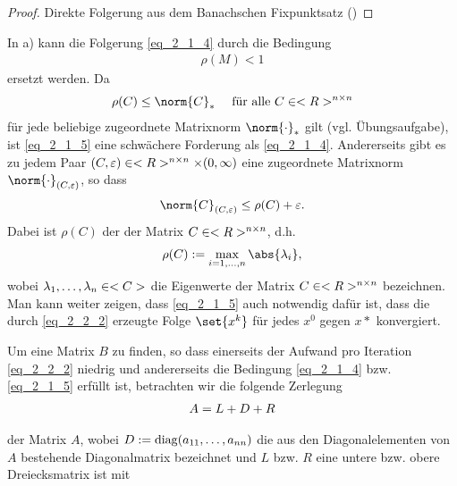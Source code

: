 \begin{proof}
	Direkte Folgerung aus dem Banachschen Fixpunktsatz ()
\end{proof}


\begin{remark}
	In a) kann die Folgerung \cref{eq_2_1_4} durch die Bedingung
	\begin{align}
	\rho(M) < 1\label{eq_2_1_5}
	\end{align}
	ersetzt werden. Da
	\begin{align}
		\rho(C) \le \norm{C}_{\ast} \quad \text{ für alle } C \in \Rnn \notag
	\end{align}
	für jede beliebige zugeordnete Matrixnorm $\norm{\cdot}_{\ast}$ gilt (vgl. Übungsaufgabe), ist \cref{eq_2_1_5} eine schwächere Forderung als \cref{eq_2_1_4}. Andererseits gibt es zu jedem Paar $(C,\varepsilon) \in <R>^{n \times n} \times (0,\infty)$ eine zugeordnete Matrixnorm $\norm{\cdot}_{(C,\epsilon)}$, so dass
	\begin{align}
		\norm{C}_{(C,\epsilon)} \le \rho(C) + \epsilon. \notag
	\end{align}
	Dabei ist $\rho(C)$ der  der Matrix $C \in <R>^{n \times n}$, d.h.
	\begin{align}
		\rho(C) := \max_{i = 1,\dots,n}\abs{\lambda_i}, \notag
	\end{align}
	wobei $\lambda_1,\dots,\lambda_n \in <C>$ die Eigenwerte der Matrix $C \in <R>^{n \times n}$ bezeichnen. Man kann weiter zeigen, dass \cref{eq_2_1_5} auch notwendig dafür ist, dass die durch \cref{eq_2_2_2} erzeugte Folge $\set{x^k}$ für jedes $x^0$ gegen $x*$ konvergiert.
\end{remark}

Um eine Matrix $B$ zu finden, so dass einerseits der Aufwand pro Iteration \cref{eq_2_2_2} niedrig und andererseits die Bedingung \cref{eq_2_1_4} bzw. \cref{eq_2_1_5} erfüllt ist, betrachten wir die folgende Zerlegung
\begin{align}
	A = L + D + R \notag
\end{align}

der Matrix $A$, wobei $D:= \operatorname{diag}(a_{11}, \dots, a_{nn})$ die aus den Diagonalelementen von $A$ bestehende Diagonalmatrix bezeichnet und $L$ bzw. $R$ eine untere bzw. obere Dreiecksmatrix ist mit

